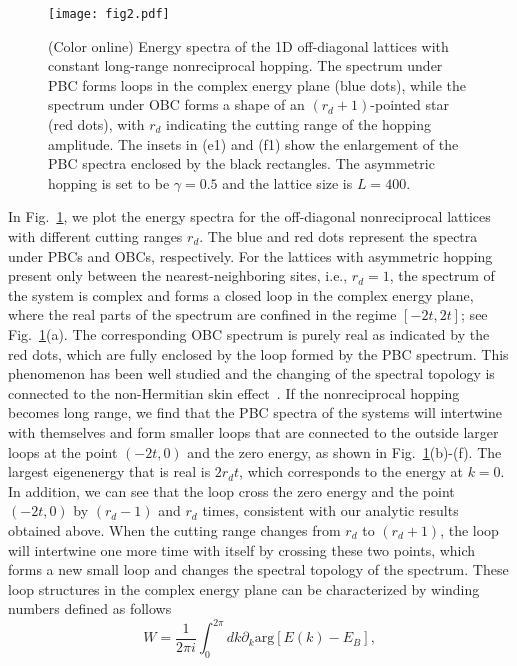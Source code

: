\documentclass[prb,aps,twocolumn,showpacs]{revtex4-2} %
\begin{document}
\begin{figure}[t]
	\texttt{[image: fig2.pdf]}
	\caption{(Color online) Energy spectra of the 1D off-diagonal lattices with constant long-range nonreciprocal hopping. The spectrum under PBC forms loops in the complex energy plane (blue dots), while the spectrum under OBC forms a shape of an $(r_d+1)$-pointed star (red dots), with $r_d$ indicating the cutting range of the hopping amplitude. The insets in (e1) and (f1) show the enlargement of the PBC spectra enclosed by the black rectangles. The asymmetric hopping is set to be $\gamma=0.5$ and the lattice size is $L=400$.}
	\label{fig2}
\end{figure} 

In Fig.~\ref{fig2}, we plot the energy spectra for the off-diagonal nonreciprocal lattices with different cutting ranges $r_d$. The blue and red dots represent the spectra under PBCs and OBCs, respectively. For the lattices with asymmetric hopping present only between the nearest-neighboring sites, i.e., $r_d=1$, the spectrum of the system is complex and forms a closed loop in the complex energy plane, where the real parts of the spectrum are confined in the regime $[-2t,2t]$; see Fig.~\ref{fig2}(a). The corresponding OBC spectrum is purely real as indicated by the red dots, which are fully enclosed by the loop formed by the PBC spectrum. This phenomenon has been well studied and the changing of the spectral topology is connected to the non-Hermitian skin effect~\cite{Borgnia2020PRL,Okuma2020PRL,Zhang2020PRL}. If the nonreciprocal hopping becomes long range, we find that the PBC spectra of the systems will intertwine with themselves and form smaller loops that are connected to the outside larger loops at the point $(-2t,0)$ and the zero energy, as shown in Fig.~\ref{fig2}(b)-(f). The largest eigenenergy that is real is $2r_d t$, which corresponds to the energy at $k=0$. In addition, we can see that the loop cross the zero energy and the point $(-2t,0)$ by $(r_d-1)$ and $r_d$ times, consistent with our analytic results obtained above. When the cutting range changes from $r_d$ to $(r_d+1)$, the loop will intertwine one more time with itself by crossing these two points, which forms a new small loop and changes the spectral topology of the spectrum. These loop structures in the complex energy plane can be characterized by winding numbers defined as follows
\begin{equation}\label{W}
W = \frac{1}{2\pi i} \int_0^{2\pi} dk \partial_k \text{arg} [ E(k) - E_B],
\end{equation}
\end{document}
